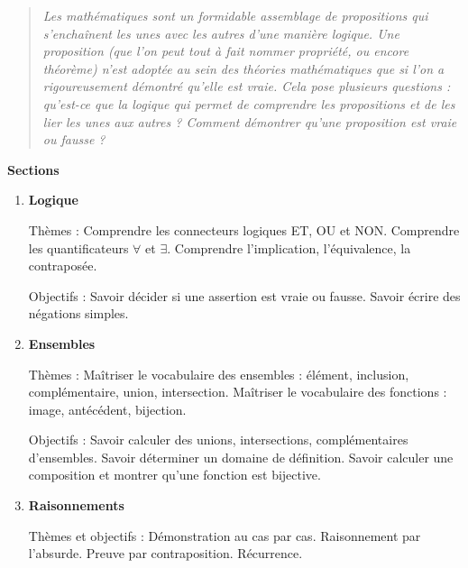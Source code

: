 \documentclass[11pt,a4paper]{report}
\begin{document}



\bigskip
\bigskip

\begin{quote}
\center
\emph{
    Les mathématiques sont un formidable assemblage de propositions qui s'enchaînent les unes avec les autres d'une manière logique. Une proposition (que l'on peut tout à fait nommer \emph{propriété}, ou encore \emph{théorème}) n'est adoptée au sein des théories mathématiques que si l'on a rigoureusement démontré qu'elle est vraie.     
    Cela pose plusieurs questions : qu'est-ce que la \emph{logique} qui permet de comprendre les propositions et de les lier les unes aux autres ? Comment démontrer qu'une proposition est vraie ou fausse ?
    }
\end{quote}

\bigskip
\bigskip


\textbf{Sections}
\begin{enumerate}[label=\arabic*.]
    \item \textbf{Logique}
    
    Thèmes : 
    Comprendre les connecteurs logiques  ET, OU et NON.
    Comprendre les quantificateurs $\forall$ et $\exists$.
    Comprendre l'implication, l'équivalence, la contraposée.
    
    
    Objectifs :
    Savoir décider si une assertion est vraie ou fausse.
    Savoir écrire des négations simples.
    
    
    
     \item  \textbf{Ensembles}
 
     Thèmes :
     Maîtriser le vocabulaire des ensembles : élément, inclusion, complémentaire, union, intersection.
     Maîtriser le vocabulaire des fonctions : image, antécédent, bijection.
 
     Objectifs :    
     Savoir calculer des unions, intersections, complémentaires d'ensembles.
     Savoir déterminer un domaine de définition.
     Savoir calculer une composition et montrer qu'une fonction est bijective.
    
    
    \item  \textbf{Raisonnements}
    
    Thèmes et objectifs :     
    Démonstration au cas par cas.
    Raisonnement par l'absurde.
    Preuve par contraposition.
    Récurrence.  

\end{enumerate}
\end{document}
